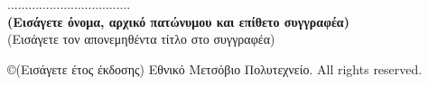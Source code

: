\documentclass[12pt, twoside, a4paper]{report}
\begin{document}
\vspace{30ex}
\noindent
................................... \\
\textbf{(Εισάγετε όνομα, αρχικό πατώνυμου και επίθετο συγγραφέα)} \\
(Εισάγετε τον απονεμηθέντα τίτλο στο συγγραφέα) \\
\vspace{8ex}


\vspace{50ex}

\small
\noindent
\copyright \hspace{1em}(Εισάγετε έτος έκδοσης) Εθνικό Μετσόβιο Πολυτεχνείο.
All rights reserved.






\tableofcontents

\listoffigures

















\end{document}
